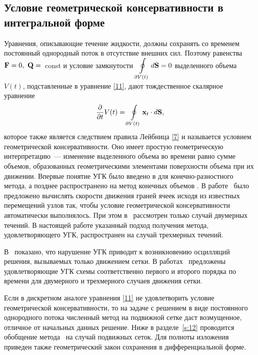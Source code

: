 \subsection{Условие геометрической консервативности в интегральной форме}
\label{s:113}
Уравнения, описывающие течение жидкости, должны сохранять со временем постоянный однородный поток в 
отсутствие внешних сил. Поэтому равенства ${\bf{F}} = 0,\ {\bf{Q}} =$~const и условие
замкнутости $\displaystyle\oint\limits_{\partial V(t)} {d{\bf{S}}} = 0$ выделенного объема $V(t)$, 
подставленные в уравнение \eqref{11}, дают тождественное скалярное уравнение
\begin{equation}
  \label{12} 
  \frac{\partial }{{\partial t}}V(t) =
  \displaystyle\oint\limits_{\partial V(t)} {{\bf{x}}_t  \cdot d{\bf{S}}},
\end{equation}
которое также является следствием правила Лейбница \eqref{7} и называется условием геометрической 
консервативности. Оно имеет простую геометрическую интерпретацию~--- изменение
выделенного объема во времени равно сумме объемов, образованных геометрическими элементами поверхности объема 
при их движении. Впервые понятие УГК было введено в \cite{trulio} для конечно-разностного метода, а позднее 
распространено на метод конечных объемов \cite{thomas,demper}. В работе~\cite{demper} было предложено 
вычислять скорости движения граней ячеек исходя из известных перемещений узлов так, чтобы условие 
геометрической консервативности автоматически выполнялось. При этом в~\cite{demper} рассмотрен только случай 
двумерных течений. В настоящей работе указанный подход получения метода, удовлетворяющего УГК, распространен 
на случай трехмерных течений.

В~\cite{demper,shyy,lesoin} показано, что нарушение УГК приводит к возникновению осцилляций решения, 
вызываемых только движением сетки. В работах~\cite{lesoin,koobus} предложены удовлетворяющие УГК схемы
соответственно первого и второго порядка по времени для двумерного и трехмерного случаев движения сетки.

Если в дискретном аналоге уравнения \eqref{11} не удовлетворить условие геометрической консервативности, то 
на задаче с решением в виде постоянного однородного потока численный метод на подвижной
сетке даст возмущенное, отличное от начальных данных решение. Ниже в разделе~\ref{s:12} проводится обобщение 
метода~\cite{Cher} на случай подвижных сеток. Для полноты изложения приведен также геометрический закон 
сохранения в дифференциальной форме.

